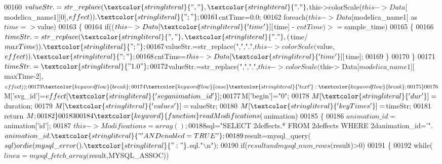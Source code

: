 \begin{DoxyCode}
00160                       $valueStr.=str\_replace(\textcolor{stringliteral}{","},\textcolor{stringliteral}{"."},$this->colorScale($this->
      Data[$modelica\_name1][0],$effect)).\textcolor{stringliteral}{"; "};
00161                       $cntTime=0.0;
00162                       \textcolor{keywordflow}{foreach}($this->Data[$modelica\_name1] as $time=>$value)
00163                       \{
00164                         \textcolor{keywordflow}{if}(($this->Data[\textcolor{stringliteral}{'time'}][$time] - $cntTime)>=
      $sample\_time)
00165                         \{
00166                           $timeStr.=str\_replace(\textcolor{stringliteral}{","},\textcolor{stringliteral}{"."},($time/$maxTime)).\textcolor{stringliteral}{"; "};
00167                           $valueStr.=str\_replace(\textcolor{stringliteral}{","},\textcolor{stringliteral}{"."},$this->colorScale(
      $value,$effect)).\textcolor{stringliteral}{"; "};
00168                           $cntTime=$this->Data[\textcolor{stringliteral}{'time'}][$time];
00169                         \}
00170                       \}
00171                       $timeStr.=\textcolor{stringliteral}{"1.0"};
00172                       $valueStr.=str\_replace(\textcolor{stringliteral}{","},\textcolor{stringliteral}{"."},$this->colorScale($this->
      Data[$modelica\_name1][$maxTime-2],$effect));
00173                       \textcolor{keywordflow}{break};
00174       \textcolor{keywordflow}{case} \textcolor{stringliteral}{'text'} : \textcolor{keywordflow}{break};
00175     \}
00176     $M[\textcolor{stringliteral}{'svg\_id'}]=$effect[\textcolor{stringliteral}{'svganimation\_id'}];
00177     $M[\textcolor{stringliteral}{'begin'}]=\textcolor{stringliteral}{"0"};
00178     $M[\textcolor{stringliteral}{'dur'}]=$duration;
00179     $M[\textcolor{stringliteral}{'values'}]=$valueStr;
00180     $M[\textcolor{stringliteral}{'keyTimes'}]=$timeStr;
00181     \textcolor{keywordflow}{return} $M;
00182   \}
00183 
00184   \textcolor{keyword}{function} readModifications($animation)
00185   \{
00186     $animation\_id=$animation[\textcolor{stringliteral}{'id'}];
00187     $this->Modifications=array();
00188     $sql=\textcolor{stringliteral}{"SELECT 2deffects.* FROM 2deffects WHERE 2danimation\_id='"}.
      $animation\_id.\textcolor{stringliteral}{"' AND enabled=TRUE"};
00189     $result=mysql\_query($sql) or die(mysql\_error().\textcolor{stringliteral}{": "}.$sql.\textcolor{stringliteral}{"\(\backslash\)n"});
00190     \textcolor{keywordflow}{if}($result and mysql\_num\_rows($result)>0)
00191     \{
00192       \textcolor{keywordflow}{while}($linea=mysql\_fetch\_array($result,MYSQL\_ASSOC))

\end{DoxyCode}
